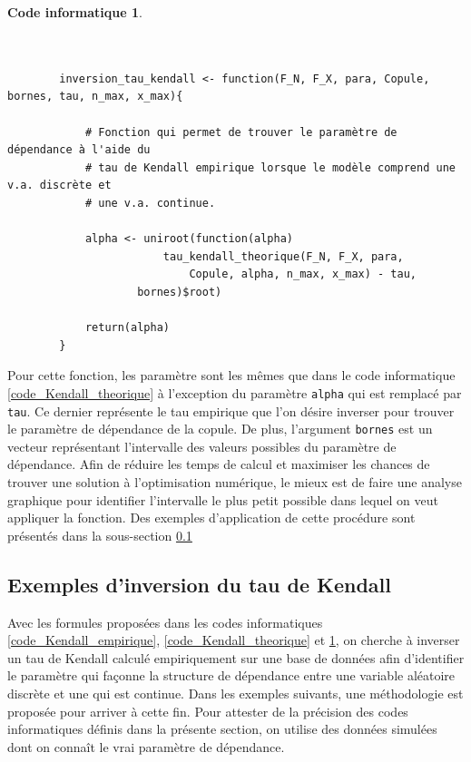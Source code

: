 \documentclass{article}
\newtheorem{code}{Code informatique}
\begin{document}
 	\begin{code}\label{code_inversion_tau_kendall}
 		\begin{verbatim}
 		
 		
 		inversion_tau_kendall <- function(F_N, F_X, para, Copule, bornes, tau, n_max, x_max){
 		
 		    # Fonction qui permet de trouver le paramètre de dépendance à l'aide du 
 		    # tau de Kendall empirique lorsque le modèle comprend une v.a. discrète et
 		    # une v.a. continue.

 		    alpha <- uniroot(function(alpha)
 		                tau_kendall_theorique(F_N, F_X, para, 
 		                    Copule, alpha, n_max, x_max) - tau,
 		            bornes)$root)
 		        
 		    return(alpha)
 		}
 		\end{verbatim}
 	\end{code}
	 Pour cette fonction, les paramètre sont les mêmes que dans le code informatique \ref{code_Kendall_theorique} à l'exception du paramètre \texttt{alpha} qui est remplacé par \texttt{tau}. Ce dernier représente le tau empirique que l'on désire inverser pour trouver le paramètre de dépendance de la copule. De plus, l'argument \texttt{bornes} est un vecteur représentant l'intervalle des valeurs possibles du paramètre de dépendance. Afin de réduire les temps de calcul et maximiser les chances de trouver une solution à l'optimisation numérique, le mieux est de faire une analyse graphique pour identifier l'intervalle le plus petit possible dans lequel on veut appliquer la fonction. Des exemples d'application de cette procédure sont présentés dans la sous-section \ref{subsect_exemples_inversion}
	 
	 \subsection{Exemples d'inversion du tau de Kendall}\label{subsect_exemples_inversion}
	 
	 Avec les formules proposées dans les codes informatiques \ref{code_Kendall_empirique}, \ref{code_Kendall_theorique} et \ref{code_inversion_tau_kendall}, on cherche à inverser un tau de Kendall calculé empiriquement sur une base de données afin d'identifier le paramètre qui façonne la structure de dépendance entre une variable aléatoire discrète et une qui est continue. Dans les exemples suivants, une méthodologie est proposée pour arriver à cette fin. Pour attester de la précision des codes informatiques définis dans la présente section, on utilise des données simulées dont on connaît le vrai paramètre de dépendance. \\
	 
\end{document}
